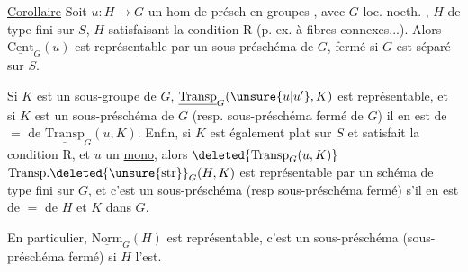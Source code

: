
\uline{Corollaire} Soit $u:H\to G$ un hom de présch en groupes , avec $G$ loc. noeth. , $H$ de type fini sur $S$,  $H$  satisfaisant la condition R (p. ex. à fibres connexes...).  Alors $\underline{\mathrm{Cent}}_G(u)$ est représentable par un sous-préschéma  de $G$,  fermé si $G$ est séparé sur $S$.

Si $K$ est un sous-groupe de $G$,   $\underline{\mathrm{Transp}}_G(\unsure{u|u'},K)$ est représentable, et si $K$ est un sous-préschéma de $G$ (resp. sous-préschéma fermé de $G$) il en est de $=$ de $\underline{\mathrm{Transp}}_G(u,K)$. Enfin, si  $K$ est également plat  sur $S$ et satisfait la condition R,  et $u$ un \uline{mono}, alors $\deleted{\mathrm{Transp}_G(u,K)}$ $\mathrm{Transp}.\deleted{\unsure{\mathrm{str}}}_G(H,K)$ est représentable par un  schéma de type fini sur $G$, et c'est un sous-préschéma (resp sous-préschéma fermé) s'il en est de $=$ de $H$ et $K$ dans $G$.

En particulier, $\underline{\mathrm{Norm}}_G(H)$ est représentable, c'est un sous-préschéma (sous-préschéma fermé)  si $H$ l'est. 
